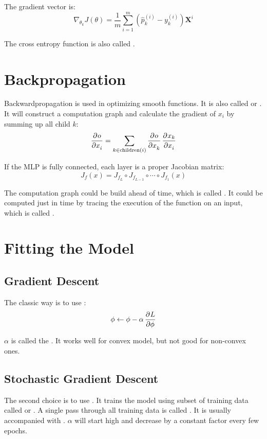 The gradient vector is:
\begin{equation}
	\nabla_{\theta_k} J(\theta) = \frac{1}{m} \sum_{i=1}^m(\hat{p}_k^{(i)} - y_k^{(i)}) \mathbf{X}^i
\end{equation}


The cross entropy function is also called .


\section{Backpropagation}

Backwardpropagation is used in optimizing smooth functions. It is also called  or . It will construct a computation graph and calculate the gradient of $x_i$ by summing up all child $k$:
\begin{equation}
    \dpd{o}{x_i} = \sum_{k \in \text{children}(i)} \dpd{o}{x_k} \dpd{x_k}{x_i}
\end{equation}

If the MLP is fully connected, each layer is a proper Jacobian matrix:
\begin{equation}
    J_f(x) = J_{f_L} \circ J_{f_{L-1}} \circ \cdots \circ J_{f_1}(x)
\end{equation}

The computation graph could be build ahead of time, which is called . It could be computed just in time by tracing the execution of the function on an input, which is called .





\section{Fitting the Model}

\subsection{Gradient Descent}
The classic way is to use :
\begin{equation}
    \phi \leftarrow \phi - \alpha \dpd{L}{\phi}
\end{equation}

$\alpha$ is called the . It works well for convex model, but not good for non-convex ones. 


\subsection{Stochastic Gradient Descent}
The second choice is to use . It trains the model using subset of training data called  or  . A single pass through all training data is called . It is usually accompanied with . $\alpha$ will start high and decrease by a constant factor every few epochs.

